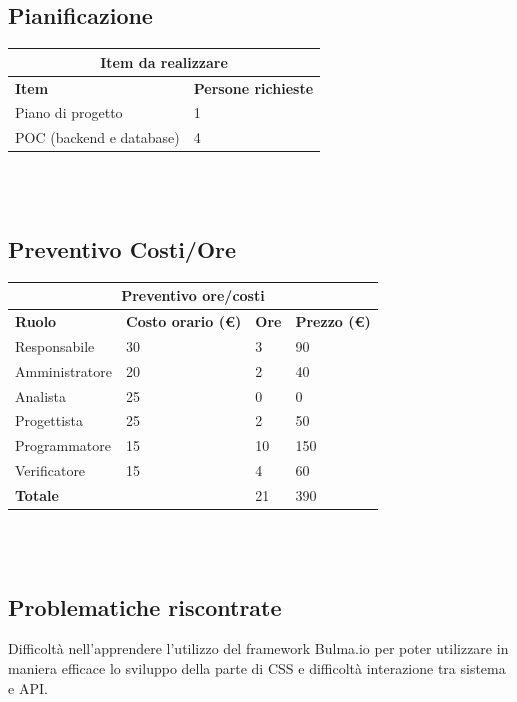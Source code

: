\documentclass[12pt]{article}
\begin{document}
\subsection{Pianificazione}
\begin{center}
    \begin{tabularx}{\textwidth}{|X|X|}
        \hline
        \multicolumn{2}{|c|}{\textbf{Item da realizzare}}\\
        \hline
        \hline
        \textbf{Item} & \textbf{Persone richieste}\\
        \hline
        Piano di progetto & 1\\
        \hline
        POC (backend e database) & 4 \\
        \hline
    \end{tabularx}\\[8pt]
    \mbox{}\\
\end{center}
\subsection{Preventivo Costi/Ore}
\begin{center}
    \begin{tabularx}{\textwidth}{|X|X|X|X|}
        \hline
        \multicolumn{4}{|c|}{\textbf{Preventivo ore/costi}}\\
        \hline
        \hline
        \textbf{Ruolo} & \textbf{Costo orario (\euro)} & \textbf{Ore} & \textbf{Prezzo (\euro)}\\
        \hline
        Responsabile    & 30 & 3 & 90\\   
        \hline
        Amministratore  & 20 & 2  & 40\\ 
        \hline
        Analista        & 25 & 0  & 0\\ 
        \hline
        Progettista     & 25 & 2  & 50\\
        \hline
        Programmatore   & 15 & 10  & 150\\
        \hline
        Verificatore    & 15 & 4  & 60\\
        \hline  
        \textbf{Totale} &    & 21 & 390\\
        \hline
    \end{tabularx}\\[8pt]
    \mbox{}\\
\end{center}
\subsection{Problematiche riscontrate}
Difficoltà nell’apprendere l’utilizzo del framework Bulma.io per poter utilizzare in maniera efficace lo sviluppo della parte di CSS e difficoltà interazione tra sistema e API. 
\end{document}
